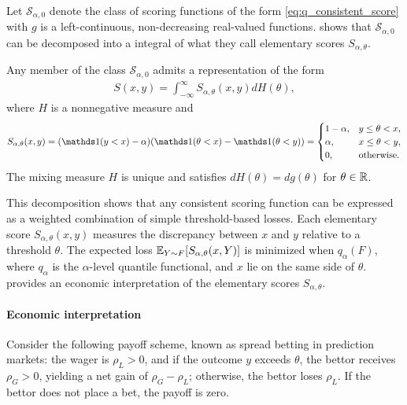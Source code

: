 Let $\mathcal{S}_{\alpha,0}$ denote the class of scoring functions of the form \eqref{eq:q_consistent_score} with $g$ is a left-continuous, non-decreasing real-valued functions. \cite{ehm2016binarydecomp} shows that $\mathcal{S}_{\alpha,0}$ can be decomposed into a integral of what they call elementary scores $S_{\alpha, \theta}$.

\begin{theorem} \label{thm:decomp_single_q}
  Any member of the class $\mathcal{S}_{\alpha,0}$ admits a representation of the form 
  \begin{align}\label{eq:elem_score_q}
  S(x,y) = \int_{-\infty}^{\infty} S_{\alpha,\theta}(x,y) dH(\theta),
  \end{align}
  where $H$ is a nonnegative measure and 
  \[
  S_{\alpha, \theta}(x,y) = (\one(y<x)-\alpha)(\one(\theta<x)-\one(\theta<y)) 
  =
  \begin{cases}
      1-\alpha, & y \leq \theta < x,  \\
      \alpha, & x \leq \theta < y, \\
      0, & \text{otherwise}.
  \end{cases}
  \]
  The mixing measure $H$ is unique and satisfies $dH(\theta)=dg(\theta)$ for $\theta\in\mathbb{R}$. %
\end{theorem}

This decomposition shows that any consistent scoring function can be expressed as a weighted combination of simple threshold-based losses. Each elementary score $S_{\alpha,\theta}(x,y)$ measures the discrepancy between $x$ and $y$ relative to a threshold $\theta$. The expected loss $\mathbb{E}_{Y\sim F}[S_{\alpha,\theta}(x,Y)]$ is minimized when $q_\alpha(F)$, where $q_\alpha$ is the $\alpha$-level quantile functional, and $x$ lie on the same side of $\theta$. \cite{ehm2016binarydecomp} provides an economic interpretation of the elementary scores $S_{\alpha,\theta}$.

\paragraph{Economic interpretation}
Consider the following payoff scheme, known as spread betting in prediction markets: the wager is $\rho_L > 0$, and if the outcome $y$ exceeds $\theta$, the bettor receives $\rho_G > 0$, yielding a net gain of $\rho_G - \rho_L$; otherwise, the bettor loses $\rho_L$. If the bettor does not place a bet, the payoff is zero.

